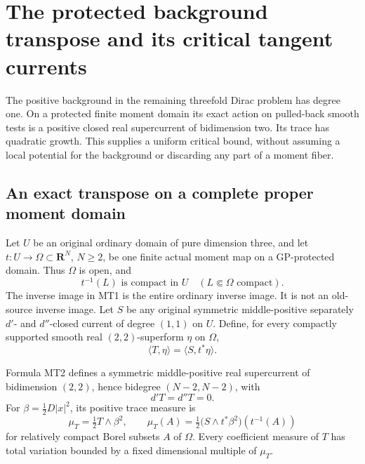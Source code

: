 \section{The protected background transpose and its critical tangent currents}
\label{sec:r13-protected-background-trace}

The positive background in the remaining threefold Dirac
problem has degree one.  On a protected finite moment domain
its exact action on pulled-back smooth tests is a positive
closed real supercurrent of bidimension two.  Its trace has
quadratic growth.  This supplies a uniform critical bound,
without assuming a local potential for the background or
discarding any part of a moment fiber.

\subsection{An exact transpose on a complete proper moment domain}

Let \(U\) be an original ordinary domain of pure dimension
three, and let \(t:U\to\Omega\subset\mathbf R^N\), \(N\ge2\), be one
finite actual moment map on a GP-protected domain.  Thus
\(\Omega\) is open, and
\[
       t^{-1}(L)\text{ is compact in }U
                         \quad(L\Subset\Omega\text{ compact}).
\tag{MT1}
\]
The inverse image in MT1 is the entire ordinary inverse
image.  It is not an old-source inverse image.  Let \(S\)
be any original symmetric middle-positive separately
\(d'\)- and \(d''\)-closed current of degree \((1,1)\)
on \(U\).  Define, for every compactly supported smooth
real \((2,2)\)-superform \(\eta\) on \(\Omega\),
\[
                       \langle T,\eta\rangle
                              =\langle S,t^*\eta\rangle.
\tag{MT2}
\]

\begin{proposition}
\label{prop:r13-protected-background-transpose}
Formula MT2 defines a symmetric middle-positive real
supercurrent of bidimension \((2,2)\), hence bidegree
\((N-2,N-2)\), with
\[
                       d'T=d''T=0.
\tag{MT3}
\]
For \(\beta=\tfrac12D|x|^2\), its positive trace measure
is
\[
             \mu_T=\tfrac12T\wedge\beta^2,
 \qquad
 \mu_T(A)=\tfrac12
       \bigl(S\wedge t^*\beta^2\bigr)(t^{-1}(A))
\tag{MT4}
\]
for relatively compact Borel subsets \(A\) of \(\Omega\).
Every coefficient measure of \(T\) has total variation
bounded by a fixed dimensional multiple of \(\mu_T\).
\end{proposition}

